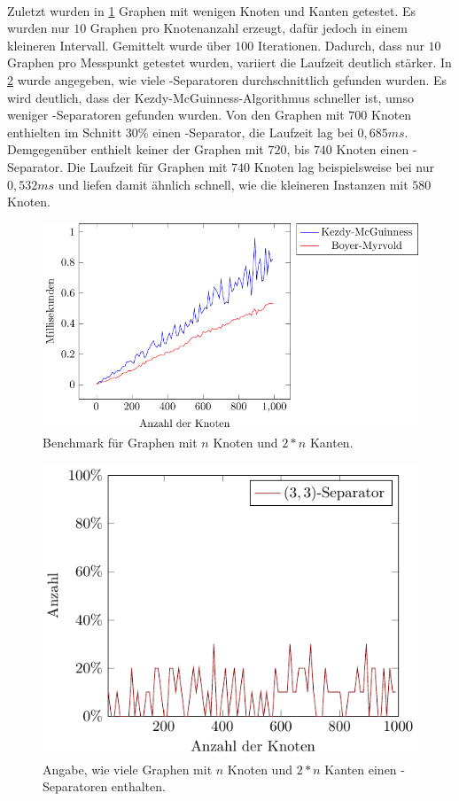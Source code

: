 \ \\

Zuletzt wurden in \Abb \ref{fig:Benchmarks-Small} Graphen mit wenigen Knoten und Kanten getestet.
Es wurden nur $10$ Graphen pro Knotenanzahl erzeugt, dafür jedoch in einem kleineren Intervall.
Gemittelt wurde über $100$ Iterationen.
Dadurch, dass nur $10$ Graphen pro Messpunkt getestet wurden, variiert die Laufzeit deutlich stärker.
In \Abb \ref{fig:Statistics-Small} wurde angegeben, wie viele \dd-Separatoren durchschnittlich gefunden wurden.
Es wird deutlich, dass der Kezdy-McGuinness-Algorithmus schneller ist, umso weniger \dd-Separatoren gefunden wurden.
Von den Graphen mit $700$ Knoten enthielten im Schnitt $30\%$ einen \dd-Separator, die Laufzeit lag bei $0,685ms$.
Demgegenüber enthielt keiner der Graphen mit $720$, bis $740$ Knoten einen \dd-Separator.
Die Laufzeit für Graphen mit $740$ Knoten lag beispielsweise bei nur $0,532ms$ und liefen damit ähnlich schnell, wie die kleineren Instanzen mit $580$ Knoten.

\begin{figure}[H]
  \centering
  \includegraphics[width=\textwidth,height=\textheight,keepaspectratio]{plots/Benchmarks_Small.pdf}
  \caption{Benchmark für Graphen mit $n$ Knoten und $2*n$ Kanten.}
  \label{fig:Benchmarks-Small}
\end{figure}

\begin{figure}[H]
  \centering
  \includegraphics[width=\textwidth,height=\textheight,keepaspectratio]{plots/Statistics_Small.pdf}
  \caption{Angabe, wie viele Graphen mit $n$ Knoten und $2*n$ Kanten einen \dd-Separatoren enthalten.}
  \label{fig:Statistics-Small}
\end{figure}
